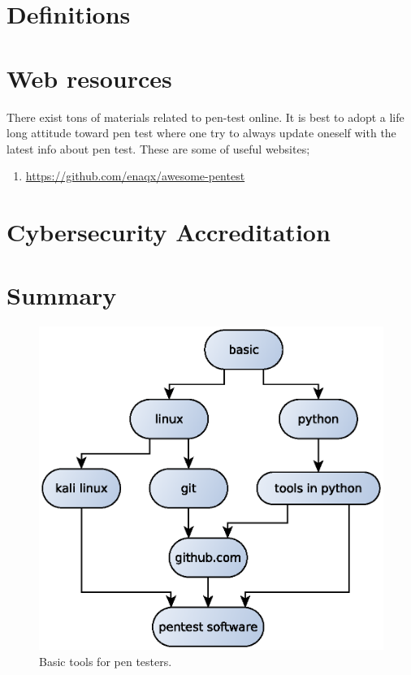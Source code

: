 \documentclass[7x9]{times}
\begin{document}
\section{Definitions}

\section{Web resources}

There exist tons of materials related to pen-test online. It is best to adopt
a life long attitude toward pen test where one try to always update oneself
with the latest info about pen test. These are some of useful websites;
\begin{enumerate}
\item \url{https://github.com/enaqx/awesome-pentest}
\end{enumerate}


\section{Cybersecurity Accreditation}



\section{Summary}

\begin{center}
	\begin{figure}[ht]
		\includegraphics[scale=.75]{tools.eps}
		\caption{Basic tools for pen testers.}
	\end{figure}
\end{center}
\end{document}
